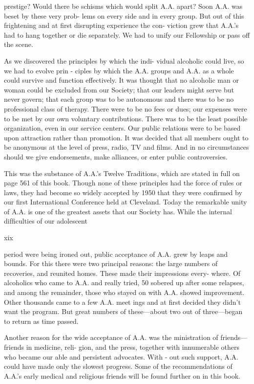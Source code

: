 
prestige? Would there be schisms which would split
A.A. apart? Soon A.A. was beset by these very prob-
lems on every side and in every group. But out of this
frightening and at ﬁrst disrupting experience the con-
viction grew that A.A.’s had to hang together or die
separately. We had to unify our Fellowship or pass
off the scene.

As we discovered the principles by which the indi-
vidual alcoholic could live, so we had to evolve prin -
ciples by which the A.A. groups and A.A. as a whole
could survive and function effectively. It was thought
that no alcoholic man or woman could be excluded
from our Society; that our leaders might serve but
never govern; that each group was to be autonomous
and there was to be no professional class of therapy.
There were to be no fees or dues; our expenses were
to be met by our own voluntary contributions. There
was to be the least possible organization, even in our
service centers. Our public relations were to be based
upon attraction rather than promotion. It was decided
that all members ought to be anonymous at the level
of press, radio, TV and ﬁlms. And in no circumstances
should we give endorsements, make alliances, or enter
public controversies.

This was the substance of A.A.’s Twelve Traditions,
which are stated in full on page 561 of this book.
Though none of these principles had the force of rules
or laws, they had become so widely accepted by 1950
that they were conﬁrmed by our ﬁrst International
Conference held at Cleveland. Today the remarkable
unity of A.A. is one of the greatest assets that our
Society has.
While the internal difﬁculties of our adolescent

xix

period were being ironed out, public acceptance of
A.A. grew by leaps and bounds. For this there were two
principal reasons: the large numbers of recoveries, and
reunited homes. These made their impressions every-
where. Of alcoholics who came to A.A. and really tried,
50%
sobered up after some relapses, and among the remainder,
those who stayed on with A.A. showed improvement.
Other thousands came to a few A.A. meet ings and at
ﬁrst decided they didn’t want the program. But great
numbers of these—about two out of three—began to
return as time passed.

Another reason for the wide acceptance of A.A. was
the ministration of friends—friends in medicine, reli-
gion, and the press, together with innumerable others
who became our able and persistent advocates. With -
out such support, A.A. could have made only the
 slowest progress. Some of the recommendations of
A.A.’s early medical and religious friends will be found
further on in this book.

